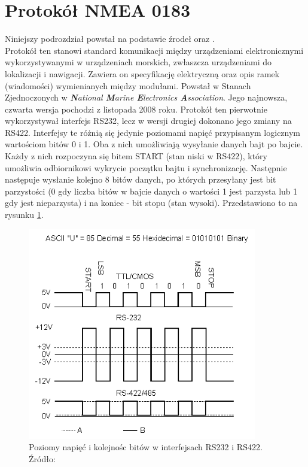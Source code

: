 \section{Protokół NMEA 0183}
\label{NMEA}

Niniejszy podrozdział powstał na podstawie źrodeł \cite{inzynierka} oraz \cite{QUECTEL_HW_DESIGN}.\\

Protokół ten stanowi standard komunikacji między urządzeniami elektronicznymi wykorzystywanymi w urządzeniach morskich, zwłaszcza urządzeniami do lokalizacji i nawigacji. Zawiera on specyfikację elektryczną oraz opis ramek (wiadomości) wymienianych między modułami. Powstał w Stanach Zjednoczonych w \textit{\textbf{N}ational \textbf{M}arine \textbf{E}lectronics \textbf{A}ssociation}. Jego najnowsza, czwarta wersja pochodzi z listopada 2008 roku. 
Protokół ten pierwotnie wykorzystywał interfejs RS232, lecz w wersji drugiej dokonano jego zmiany na RS422. Interfejsy te różnią się jedynie poziomami napięć przypisanym logicznym wartościom bitów 0 i 1. 
Oba z nich umożliwiają wysyłanie danych bajt po bajcie. Każdy z nich rozpoczyna się bitem START (stan niski w RS422), który umożliwia odbiornikowi wykrycie początku bajtu i synchronizację. Następnie następuje wysłanie kolejno 8 bitów danych, po których przesyłany jest bit parzystości (0 gdy liczba bitów w bajcie danych o wartości 1 jest parzysta lub 1 gdy jest nieparzysta) i na koniec - bit stopu (stan wysoki). Przedstawiono to na rysunku \ref{fig:image_nmea_rs422}.

\begin{figure}[H]
	\centering
	\includegraphics[width=10cm]{img/theory/NMEA/RS232_RS422.png}
	\caption{Poziomy napięć i kolejnośc bitów w interfejsach RS232 i RS422. Źródło: \cite{RS422}}
	\label{fig:image_nmea_rs422}
\end{figure}


